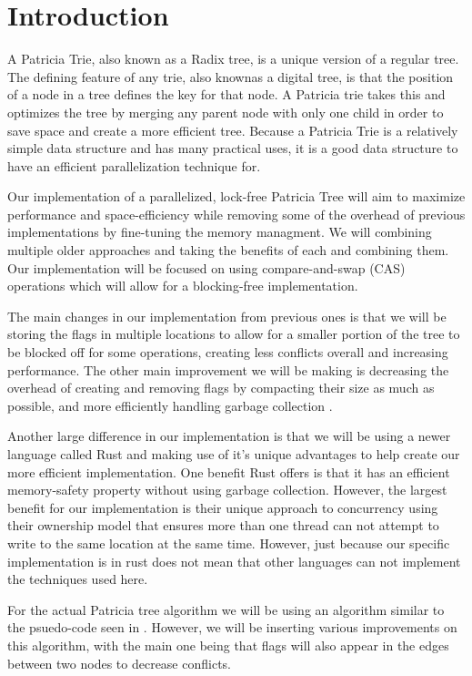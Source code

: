 \documentclass[conference]{IEEEtran}
\begin{document}
\section{Introduction}
A Patricia Trie, also known as a Radix tree, is a unique version of a regular tree. The defining feature of any trie, also knownas a digital tree, is that the position of a node in a tree defines the key for that node. A Patricia trie takes this and optimizes the tree by merging any parent node with only one child in order to save space and create a more efficient tree.\cite{Shafiei2013} Because a Patricia Trie is a relatively simple data structure and has many practical uses, it is a good data structure to have an efficient parallelization technique for. 
\par
Our implementation of a parallelized, lock-free Patricia Tree will aim to maximize performance and space-efficiency while removing some of the overhead of previous implementations by fine-tuning the memory managment. We will combining multiple older approaches and taking the benefits of each and combining them. Our implementation will be focused on using compare-and-swap (CAS) operations which will allow for a blocking-free implementation. \cite{Shafiei2013,Brown2014}
\par
The main changes in our implementation from previous ones is that we will be storing the flags in multiple locations to allow for a smaller portion of the tree to be blocked off for some operations, creating less conflicts overall and increasing performance. \cite{Natarajan2014} The other main improvement we will be making is decreasing the overhead of creating and removing flags by compacting their size as much as possible, and more efficiently handling garbage collection . 
\par
Another large difference in our implementation is that we will be using a newer language called Rust and making use of it's unique advantages to help create our more efficient implementation. One benefit Rust offers is that it has an efficient memory-safety property without using garbage collection. However, the largest benefit for our implementation is their unique approach to concurrency using their ownership model that ensures more than one thread can not attempt to write to the same location at the same time. However, just because our specific implementation is in rust does not mean that other languages can not implement the techniques used here.
\par
For the actual Patricia tree algorithm we will be using an algorithm similar to the psuedo-code seen in \cite{Shafiei2013}. However, we will be inserting various improvements on this algorithm, with the main one being that flags will also appear in the edges between two nodes to decrease conflicts. \cite{Natarajan2014}
\end{document}
